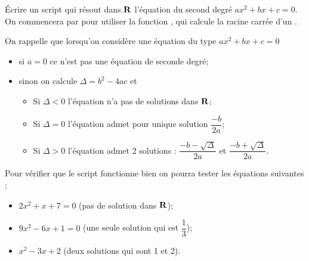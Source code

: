 \begin{exercice}
	\'Ecrire un script qui résout dans $\mathbf{R}$ l'équation du second degré $ax^2+bx+c=0$.\\
	On commencera par  pour utiliser la fonction , qui calcule la racine carrée d'un .

	On rappelle que lorsqu'on considère une équation du type $ax^2+bx+c=0$
	\begin{itemize}
		\item   si $a=0$ ce n'est pas une équation de seconde degré;
		\item   sinon on calcule $\Delta = b^2-4ac$ et
		      \begin{itemize}
			      \item   Si $\Delta<0$ l'équation n'a pas de solutions dans $\mathbf{R}$;
			      \item   Si $\Delta=0$ l'équation admet pour unique solution $\dfrac{-b}{2a}$;
			      \item   Si $\Delta>0$ l'équation admet 2 solutions : $\dfrac{-b-\sqrt{\Delta}}{2a}$ et $\dfrac{-b+\sqrt{\Delta}}{2a}$.
		      \end{itemize}
	\end{itemize}
	Pour vérifier que le script fonctionne bien on pourra tester les équations suivantes :
	\begin{itemize}
		\item   $2x^2+x+7=0$ (pas de solution dans $\mathbf{R}$);
		\item   $9x^2-6x+1=0$ (une seule solution qui est $\dfrac{1}{3}$);
		\item   $x^2-3x+2$ (deux solutions qui sont 1 et 2).
	\end{itemize}
\end{exercice}

